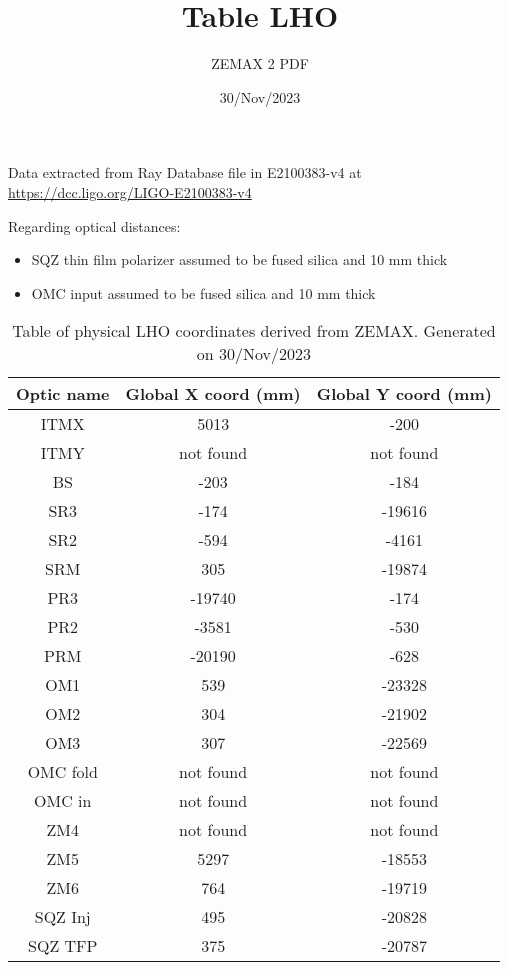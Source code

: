 \documentclass{article}
\title{Table LHO}
\author{ZEMAX 2 PDF }
\date{30/Nov/2023}
\begin{document}
\maketitle


Data extracted from Ray Database file in E2100383-v4 at \url{https://dcc.ligo.org/LIGO-E2100383-v4}


 Regarding optical distances:
\begin{itemize} 
 \item SQZ thin film polarizer assumed to be fused silica and 10 mm thick
 \item OMC input assumed to be fused silica and 10 mm thick
\end{itemize}

\begin{table}[h!] 
\centering 
\begin{tabular}{| c| c | c |} 
\hline \bf{Optic name} & \bf{Global X coord (mm)} & \bf{Global Y coord (mm)} \\ \hline 
ITMX & 5013 & -200 \\ 
ITMY & not found & not found \\ 
BS & -203 & -184 \\ 
SR3 & -174 & -19616 \\ 
SR2 & -594 & -4161 \\ 
SRM & 305 & -19874 \\ 
PR3 & -19740 & -174 \\ 
PR2 & -3581 & -530 \\ 
PRM & -20190 & -628 \\ 
OM1 & 539 & -23328 \\ 
OM2 & 304 & -21902 \\ 
OM3 & 307 & -22569 \\ 
OMC fold & not found & not found \\ 
OMC in & not found & not found \\ 
ZM4 & not found & not found \\ 
ZM5 & 5297 & -18553 \\ 
ZM6 & 764 & -19719 \\ 
SQZ Inj & 495 & -20828 \\ 
SQZ TFP & 375 & -20787 \\ 
\hline 
\end{tabular} 
\caption{Table of physical LHO coordinates derived from ZEMAX. Generated on 30/Nov/2023}
\end{table} 
\end{document}
